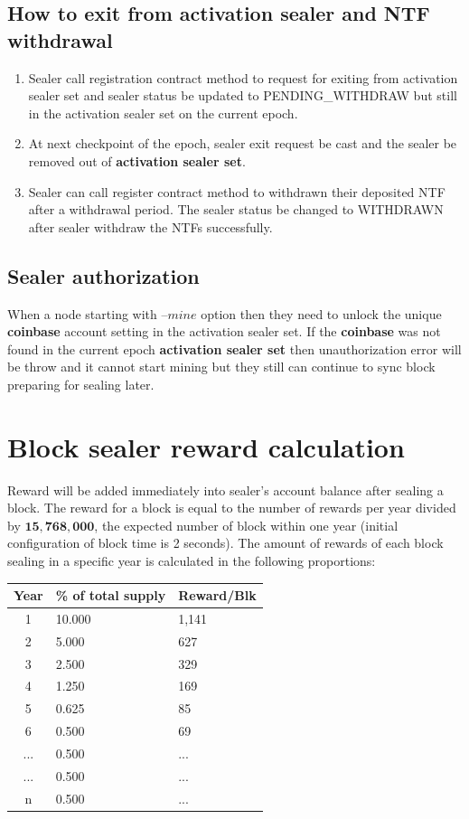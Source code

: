 \documentclass[12pt,oneside]{amsart}
\begin{document}
\begin{multicols}{2}
\subsection{How to exit from activation sealer and NTF withdrawal}
\begin{enumerate}
\item Sealer call registration contract method to request for exiting from activation sealer set and sealer status be updated to {\small PENDING\_WITHDRAW} but still in the activation sealer set on the current epoch.
\item At next checkpoint of the epoch, sealer exit request be cast and the sealer be removed out of \textbf{activation sealer set}. 
\item Sealer can call register contract method to withdrawn their deposited {\small NTF} after a withdrawal period. The sealer status be changed to {\small WITHDRAWN} after sealer withdraw the {\small NTFs} successfully.
\end{enumerate}

\subsection{Sealer authorization}
When a node starting with --${mine}$ option then they need to unlock the unique \textbf{coinbase} account setting in the activation sealer set. If the \textbf{coinbase} was not found in the current epoch \textbf{activation sealer set} then unauthorization error will be throw and it cannot start mining but they still can continue to sync block preparing for sealing later.

\section{Block sealer reward calculation}

Reward will be added immediately into sealer’s account balance after sealing a block. The reward for a block is equal to the number of rewards per year divided by $\mathbf{15,768,000}$, the expected number of block within one year (initial configuration of block time is 2 seconds). The amount of rewards of each block sealing in a specific year is calculated in the following proportions:

\begin{center}
  \begin{tabular}{c | l | l}
    \hline
    Year &  \% of total supply & Reward/Blk\\ 
    \hline
    1 & 10.000 & 1,141\\ 
    2 & 5.000 & 627 \\ 
    3 & 2.500 & 329 \\ 
    4 & 1.250 & 169 \\ 
    5 & 0.625 & 85 \\
    6 & 0.500 & 69 \\
    ... & 0.500 & ... \\
    ... & 0.500 & ... \\ 
    n & 0.500 & ... \\
    \hline
  \end{tabular}
\end{center}


\end{multicols}
\end{document}
